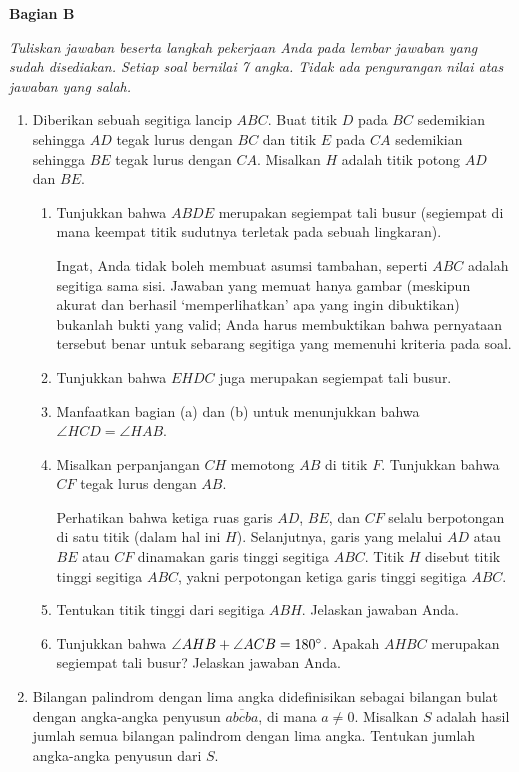 \documentclass[a4paper,12pt]{article}
\begin{document}
\begin{center}
\textbf{Bagian B}
\end{center}
{\it Tuliskan jawaban beserta langkah pekerjaan Anda pada lembar jawaban yang sudah disediakan. Setiap soal bernilai 7 angka. Tidak ada pengurangan nilai atas jawaban yang salah.}
\begin{enumerate}
\item Diberikan sebuah segitiga lancip $ABC$. Buat titik $D$ pada $BC$ sedemikian sehingga $AD$ tegak lurus dengan $BC$ dan titik $E$ pada $CA$ sedemikian sehingga $BE$ tegak lurus dengan $CA$. Misalkan $H$ adalah titik potong $AD$ dan $BE$.
\begin{enumerate}
	\item Tunjukkan bahwa $ABDE$ merupakan segiempat tali busur (segiempat di mana keempat titik sudutnya terletak pada sebuah lingkaran).

	Ingat, Anda tidak boleh membuat asumsi tambahan, seperti $ABC$ adalah segitiga sama sisi. Jawaban yang memuat hanya gambar (meskipun akurat dan berhasil `memperlihatkan' apa yang ingin dibuktikan) bukanlah bukti yang valid; Anda harus membuktikan bahwa pernyataan tersebut benar untuk sebarang segitiga yang memenuhi kriteria pada soal.

	\item Tunjukkan bahwa $EHDC$ juga merupakan segiempat tali busur.
	\item Manfaatkan bagian (a) dan (b) untuk menunjukkan bahwa $\angle HCD=\angle HAB$.
	\item Misalkan perpanjangan $CH$ memotong $AB$ di titik $F$. Tunjukkan bahwa $CF$ tegak lurus dengan $AB$.

	Perhatikan bahwa ketiga ruas garis $AD$, $BE$, dan $CF$ selalu berpotongan di satu titik (dalam hal ini $H$). Selanjutnya, garis yang melalui $AD$ atau $BE$ atau $CF$ dinamakan garis tinggi segitiga $ABC$. Titik $H$ disebut titik tinggi segitiga $ABC$, yakni perpotongan ketiga garis tinggi segitiga $ABC$.

	\item Tentukan titik tinggi dari segitiga $ABH$. Jelaskan jawaban Anda.
	\item Tunjukkan bahwa $\angle AHB+\angle ACB=180\degree$. Apakah $AHBC$ merupakan segiempat tali busur? Jelaskan jawaban Anda.

\end{enumerate}

\item Bilangan palindrom dengan lima angka didefinisikan sebagai bilangan bulat dengan angka-angka penyusun $\overline{abcba}$, di mana $a \neq 0$. Misalkan $S$ adalah hasil jumlah semua bilangan palindrom dengan lima angka. Tentukan jumlah angka-angka penyusun dari $S$.


\end{enumerate}
\end{document}
